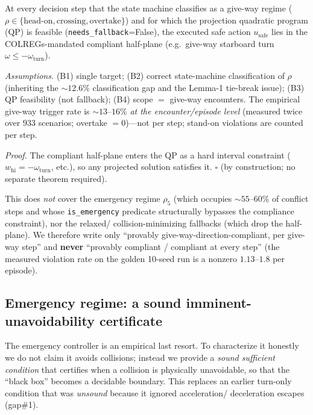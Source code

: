 \begin{proposition}
\label{prop:compliance}
At every decision step that the state machine classifies as a give-way regime
($\rho\in\{\text{head-on},\text{crossing},\text{overtake}\}$) and for which the
projection quadratic program (QP) is feasible (\texttt{needs\_fallback}=False), the
executed safe action $u_{\mathrm{safe}}$ lies in the COLREGs-mandated compliant
half-plane (e.g.\ give-way starboard turn $\omega\le-\omega_{\mathrm{turn}}$).
\end{proposition}

\emph{Assumptions.} (B1) single target; (B2) correct state-machine classification of
$\rho$ (inheriting the $\sim\!12.6\%$ classification gap and the Lemma-1 tie-break
issue); (B3) QP feasibility (not fallback); (B4) scope $=$ give-way encounters. The
empirical give-way trigger rate is $\sim\!13$--$16\%$ \emph{at the
encounter/episode level} (measured twice over $933$ scenarios; overtake $=0$)---not
per step; stand-on violations are counted per step.

\emph{Proof.} The compliant half-plane enters the QP as a hard interval constraint
($w_{\mathrm{hi}}=-\omega_{\mathrm{turn}}$, etc.), so any projected solution
satisfies it. $\square$ (by construction; no separate theorem required).

\begin{scope}
This does \emph{not} cover the emergency regime $\rho_5$ (which occupies
$\sim\!55$--$60\%$ of conflict steps and whose \texttt{is\_emergency} predicate
structurally bypasses the compliance constraint), nor the relaxed/%
collision-minimizing fallbacks (which drop the half-plane). We therefore write only
``provably give-way-direction-compliant, per give-way step'' and \textbf{never}
``provably compliant / compliant at every step'' (the measured violation rate on the
golden 10-seed run is a nonzero $1.13$--$1.8$ per episode).
\end{scope}

\subsection{Emergency regime: a sound imminent-unavoidability certificate}
\label{sec:provable-imminent}

The emergency controller is an empirical last resort. To characterize it honestly we
do not claim it avoids collisions; instead we provide a \emph{sound sufficient
condition} that certifies when a collision is physically unavoidable, so that the
``black box'' becomes a decidable boundary. This replaces an earlier
turn-only condition that was \emph{unsound} because it ignored acceleration/%
deceleration escapes (gap\#1).

